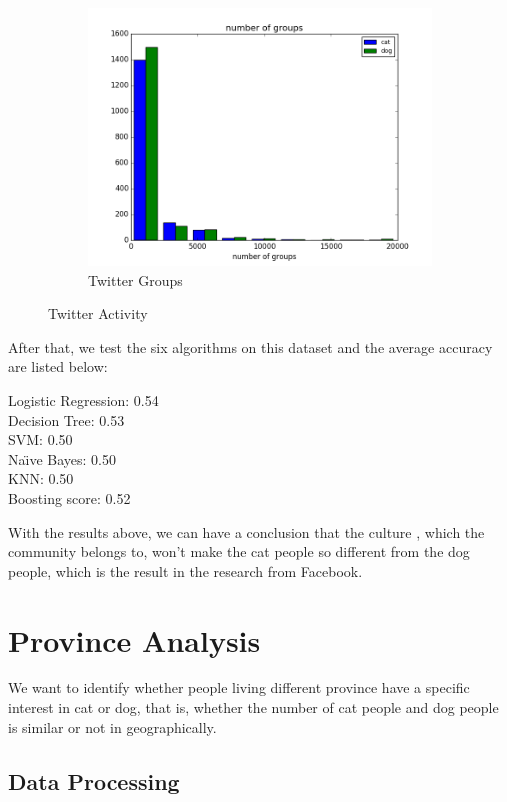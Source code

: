 \documentclass[12pt]{article}
\begin{document}
\begin{figure}[h!]
\begin{subfigure}[b]{0.3\linewidth}
    \includegraphics[width=\linewidth]{../MovieFollowInformation/twitterGroups.png}
  \caption{Twitter Groups}
  \end{subfigure}
  \caption{Twitter Activity}
  \label{fig:twitteract}
\end{figure}

\newpage

After that, we test the six algorithms on this dataset and the average accuracy are listed below:

Logistic Regression:  0.54 \\
Decision Tree:  0.53 \\
SVM:  0.50 \\
Na\"{\i}ve Bayes:  0.50 \\
KNN:  0.50 \\
Boosting score:  0.52

With the results above, we can have a conclusion that the culture , which the community belongs to, won't make the cat people so different from the dog people, which is the result in the research from Facebook.

\section{Province Analysis}

We want to identify whether people living different province have a specific interest in cat or dog, that is, whether the number of cat people and dog people is similar or not in geographically.

\subsection{Data Processing}
\end{document}
